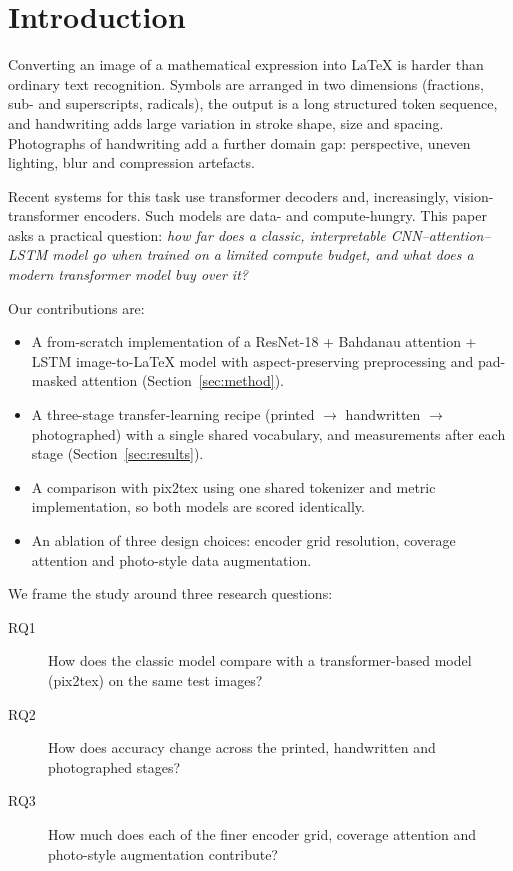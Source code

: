 \documentclass[conference]{IEEEtran}
\begin{document}
\section{Introduction}
Converting an image of a mathematical expression into \LaTeX{} is harder than ordinary text recognition. Symbols are arranged in two dimensions (fractions, sub- and superscripts, radicals), the output is a long structured token sequence, and handwriting adds large variation in stroke shape, size and spacing. Photographs of handwriting add a further domain gap: perspective, uneven lighting, blur and compression artefacts.

Recent systems for this task use transformer decoders and, increasingly, vision-transformer encoders. Such models are data- and compute-hungry. This paper asks a practical question: \emph{how far does a classic, interpretable CNN--attention--LSTM model go when trained on a limited compute budget, and what does a modern transformer model buy over it?}

Our contributions are:
\begin{itemize}
\item A from-scratch implementation of a ResNet-18 + Bahdanau attention + LSTM image-to-\LaTeX{} model with aspect-preserving preprocessing and pad-masked attention (Section~\ref{sec:method}).
\item A three-stage transfer-learning recipe (printed $\rightarrow$ handwritten $\rightarrow$ photographed) with a single shared vocabulary, and measurements after each stage (Section~\ref{sec:results}).
\item A comparison with pix2tex using one shared tokenizer and metric implementation, so both models are scored identically.
\item An ablation of three design choices: encoder grid resolution, coverage attention and photo-style data augmentation.
\end{itemize}

We frame the study around three research questions:
\begin{description}
\item[RQ1] How does the classic model compare with a transformer-based model (pix2tex) on the same test images?
\item[RQ2] How does accuracy change across the printed, handwritten and photographed stages?
\item[RQ3] How much does each of the finer encoder grid, coverage attention and photo-style augmentation contribute?
\end{description}
\end{document}
